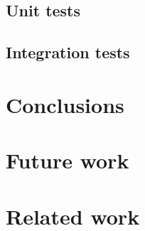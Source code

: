 \documentclass[12pt, oneside]{book}
\begin{document}
\section{Unit tests}
\section{Integration tests}
\label{sec:integration-tests}

\chapter{Conclusions}

\chapter{Future work}
\label{chap:future-work}


\chapter{Related work}


\clearpage


\end{document}
